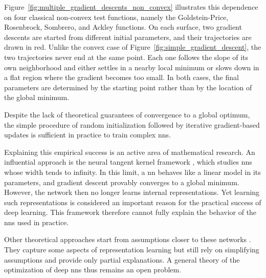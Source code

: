 Figure~\ref{fig:multiple_gradient_descents_non_convex} illustrates this dependence on four classical non-convex test functions, namely the Goldstein-Price, Rosenbrock, Sombrero, and Ackley functions.
On each surface, two gradient descents are started from different initial parameters, and their trajectories are drawn in red.
Unlike the convex case of Figure~\ref{fig:simple_gradient_descent}, the two trajectories never end at the same point.
Each one follows the slope of its own neighborhood and either settles in a nearby local minimum or slows down in a flat region where the gradient becomes too small.
In both cases, the final parameters are determined by the starting point rather than by the location of the global minimum.


Despite the lack of theoretical guarantees of convergence to a global optimum, the simple procedure of random initialization followed by iterative gradient-based updates is sufficient in practice to train complex \glspl{nn}.

Explaining this empirical success is an active area of mathematical research.
An influential approach is the neural tangent kernel framework \parencite{jacot2018neural}, which studies \glspl{nn} whose width tends to infinity.
In this limit, a \gls{nn} behaves like a linear model in its parameters, and gradient descent provably converges to a global minimum.
However, the network then no longer learns internal representations.
Yet learning such representations is considered an important reason for the practical success of deep learning.
This framework therefore cannot fully explain the behavior of the \glspl{nn} used in practice.

Other theoretical approaches start from assumptions closer to these networks \parencite{roberts2022principles}.
They capture some aspects of representation learning but still rely on simplifying assumptions and provide only partial explanations.
A general theory of the optimization of deep \glspl{nn} thus remains an open problem.

